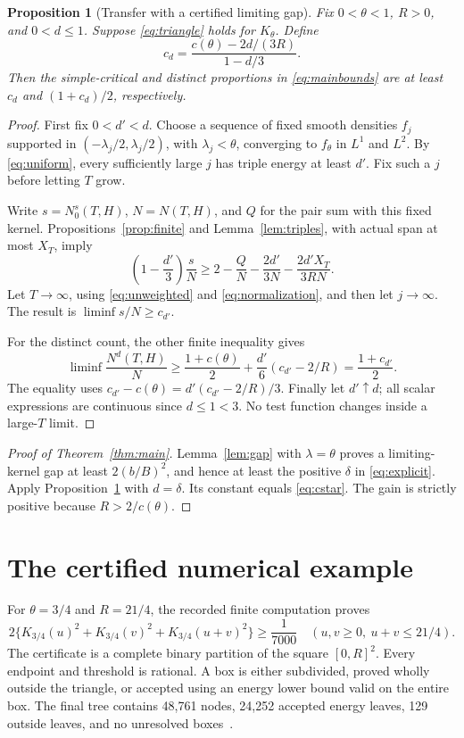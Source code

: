 \documentclass[11pt]{article}
\newtheorem{proposition}[theorem]{Proposition}
\theoremstyle{remark}
\begin{document}
\begin{proposition}[Transfer with a certified limiting gap]\label{prop:transfer}
Fix $0<\theta<1$, $R>0$, and $0<d\le1$. Suppose \eqref{eq:triangle}
holds for $K_\theta$. Define
\[
 c_d=\frac{c(\theta)-2d/(3R)}{1-d/3}.
\]
Then the simple-critical and distinct proportions in \eqref{eq:mainbounds}
are at least $c_d$ and $(1+c_d)/2$, respectively.
\end{proposition}
\begin{proof}
First fix $0<d'<d$. Choose a sequence of fixed smooth densities $f_j$
supported in $(-\lambda_j/2,\lambda_j/2)$, with
$\lambda_j<\theta$, converging to $f_\theta$ in $L^1$ and $L^2$.
By \eqref{eq:uniform}, every sufficiently large $j$ has triple energy
at least $d'$. Fix such a $j$ before letting $T$ grow.

Write $s=N_0^s(T,H)$, $N=N(T,H)$, and $Q$ for the pair sum with this
fixed kernel. Propositions~\ref{prop:finite} and Lemma~\ref{lem:triples},
with actual span at most $X_T$, imply
\[
 \left(1-\frac{d'}3\right)\frac sN
 \ge2-\frac QN-\frac{2d'}{3N}-\frac{2d'X_T}{3RN}.
\]
Let $T\to\infty$, using \eqref{eq:unweighted} and
\eqref{eq:normalization}, and then let $j\to\infty$. The result is
$\liminf s/N\ge c_{d'}$.

For the distinct count, the other finite inequality gives
\[
 \liminf\frac{N^d(T,H)}N
 \ge\frac{1+c(\theta)}2+\frac{d'}6(c_{d'}-2/R)
 =\frac{1+c_{d'}}2.
\]
The equality uses $c_{d'}-c(\theta)=d'(c_{d'}-2/R)/3$.
Finally let $d'\uparrow d$; all scalar expressions are continuous since
$d\le1<3$. No test function changes inside a large-$T$ limit.
\end{proof}

\begin{proof}[Proof of Theorem~\ref{thm:main}]
Lemma~\ref{lem:gap} with $\lambda=\theta$ proves a limiting-kernel gap
at least $2(b/B)^2$, and hence at least the positive $\delta$ in
\eqref{eq:explicit}. Apply Proposition~\ref{prop:transfer} with
$d=\delta$. Its constant equals \eqref{eq:cstar}. The gain is strictly
positive because $R>2/c(\theta)$.
\end{proof}

\section{The certified numerical example}\label{sec:certificate}

For $\theta=3/4$ and $R=21/4$, the recorded finite computation proves
\begin{equation}\label{eq:numericalgap}
 2\{K_{3/4}(u)^2+K_{3/4}(v)^2+K_{3/4}(u+v)^2\}\ge\frac1{7000}
 \quad(u,v\ge0,\ u+v\le21/4).
\end{equation}
The certificate is a complete binary partition of the square $[0,R]^2$.
Every endpoint and threshold is rational. A box is either subdivided,
proved wholly outside the triangle, or accepted using an energy lower
bound valid on the entire box. The final tree contains 48,761 nodes,
24,252 accepted energy leaves, 129 outside leaves, and no unresolved
boxes~\cite{Record}.
\end{document}
